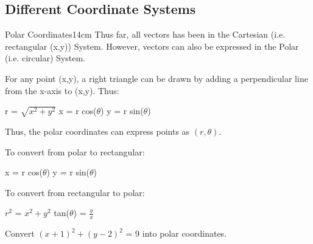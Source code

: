     \vspace{0.5cm}



\subsection{ Different Coordinate Systems }

    \begin{definition}{Polar Coordinates}{14cm}
        Thus far, all vectors has been in the Cartesian
        (i.e. rectangular (x,y)) System.
        However, vectors can also be expressed in the Polar
        (i.e. circular) System.

        \vspace{0.3cm}

        For any point (x,y), a right triangle can be drawn by
        adding a perpendicular line from the x-axis to (x,y).
        Thus:

        \hspace{0.5cm}
        r = $\sqrt{x^2 + y^2}$
        \hspace{1cm}
        x = r cos($\theta$)
        \hspace{1cm}
        y = r sin($\theta$)

        Thus, the {\color{lblue} polar coordinates} can express points
        as $(r,\theta)$.

        \hspace{0.5cm}
        To convert from polar to rectangular:

        \hspace{1cm}
        x = r cos($\theta$)
        \hspace{1cm}
        y = r sin($\theta$)

        \hspace{0.5cm}
        To convert from rectangular to polar:

        \hspace{1cm}
        $r^2$ = $x^2 + y^2$
        \hspace{1cm}
        tan($\theta$) = $\frac{y}{x}$
    \end{definition}

    \vspace{0.5cm}



    \begin{example}
        Convert $(x+1)^2 + (y-2)^2$ = 9 into polar coordinates.    
    \end{example}

